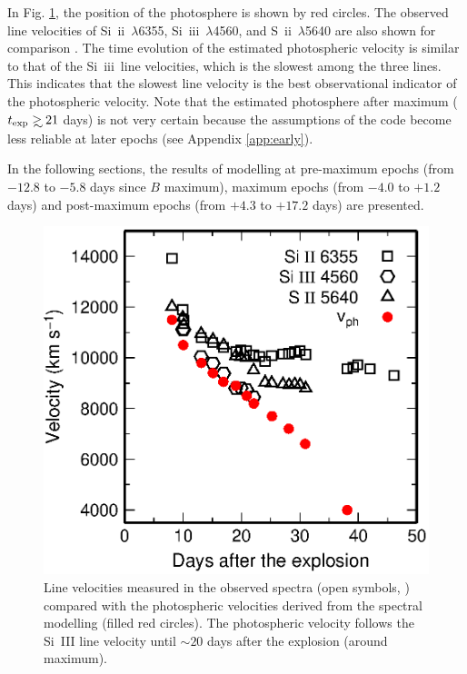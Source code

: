 \documentclass[usegraphicx,usenatbib]{mn2e}
\newcommand{\SiII}{Si~{\sc ii}}
\newcommand{\SiIII}{Si~{\sc iii}}
\newcommand{\SII}{S~{\sc ii}}
\newcommand{\texp}{t_{\rm exp}}
\def\gsim{\mathrel{\rlap{\lower 4pt \hbox{\hskip 1pt $\sim$}}\raise 1pt\hbox {$>$}}}
\begin{document}
In Fig. \ref{fig:vel}, the position of the photosphere is shown by red circles.
The observed line velocities of \SiII\ $\lambda$6355, \SiIII\ $\lambda$4560, and
\SII\ $\lambda$5640 are also shown for comparison \citep{stanishev07}. The time
evolution of the estimated photospheric velocity is  similar to that of the
\SiIII\ line velocities, which is the slowest among the three lines. 
This indicates that the slowest line velocity is the best observational indicator 
of the photospheric velocity.
Note that the estimated photosphere after maximum ($\texp \gsim 21$ days) 
is not very certain because the assumptions of the code become less 
reliable at later epochs (see Appendix \ref{app:early}).

In the following sections, the results of modelling at pre-maximum epochs (from
$-12.8$ to $-5.8$ days since $B$ maximum), maximum epochs (from $-4.0$ to $+1.2$
days) and post-maximum epochs (from $+4.3$ to $+17.2$ days) are presented.

\begin{figure}
  \includegraphics[scale=0.65]{f1.eps} 
  \caption{
Line velocities measured in the observed spectra (open symbols,
\citealt{stanishev07}) compared with the photospheric velocities derived from
the spectral modelling (filled red circles). The photospheric velocity follows
the Si~{\sc III} line velocity until $\sim 20$ days after the explosion (around
maximum).
}
\label{fig:vel}
\end{figure}
\end{document}
